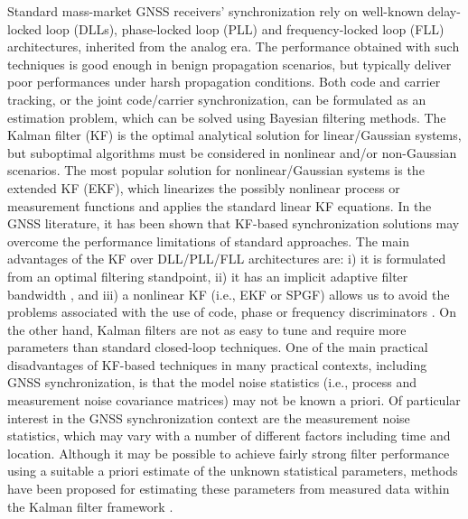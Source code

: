 \documentclass[11pt]{article}
\newcounter{algo}
\begin{document}
Standard mass-market GNSS receivers' synchronization rely on well-known delay-locked loop (DLLs), phase-locked loop (PLL) and frequency-locked loop (FLL) architectures, inherited from the analog era. The performance obtained with such techniques is good enough in benign propagation scenarios, but typically deliver poor performances under harsh propagation conditions. Both code and carrier tracking, or the joint code/carrier synchronization, can be formulated as an estimation problem, which can be solved using Bayesian filtering methods. The Kalman filter (KF) is the optimal analytical solution for linear/Gaussian systems, but suboptimal algorithms must be considered in nonlinear and/or non-Gaussian scenarios. The most popular solution for nonlinear/Gaussian systems is the extended KF (EKF), which linearizes the possibly nonlinear process or measurement functions and applies the standard linear KF equations.
In the GNSS literature, it has been shown that KF-based synchronization solutions \cite{Vila17c} may overcome the performance limitations of standard approaches. The main advantages of the KF over DLL/PLL/FLL architectures are: i) it is formulated from an optimal filtering standpoint, ii) it has an implicit adaptive filter bandwidth \cite{Vila-14a}, and iii) a nonlinear KF (i.e., EKF or SPGF) allows us to avoid the problems associated with the use of code, phase or frequency discriminators \cite{Vila-14b}. On the other hand, Kalman filters are not as easy to tune and require more parameters than standard closed-loop techniques. One of the main practical disadvantages of KF-based techniques in many practical contexts, including GNSS synchronization, is that the model noise statistics (i.e., process and measurement noise covariance matrices) may not be known a priori. Of particular interest in the GNSS synchronization context are the measurement noise statistics, which may vary with a number of different factors including time and location. Although it may be possible to achieve fairly strong filter performance using a suitable a priori estimate of the unknown statistical parameters, methods have been proposed for estimating these parameters from measured data within the Kalman filter framework \cite{Dunik17a}.
\end{document}
